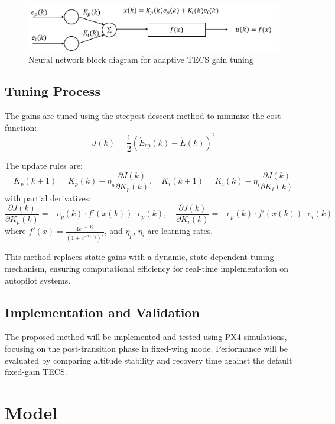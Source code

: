 \documentclass[journal,article,submit,pdftex,moreauthors]{Definitions/mdpi}
\begin{document}
\begin{figure}[H]
    \centering
    \includegraphics[width=0.6\linewidth]{neural_network_diagram.png}
    \caption{Neural network block diagram for adaptive TECS gain tuning}
    \label{fig:neural_network_block_diagram}
\end{figure}

\subsection{Tuning Process}
The gains are tuned using the steepest descent method to minimize the cost function:
\begin{equation}
    J(k) = \frac{1}{2}(\dot{E}_{\text{sp}}(k) - \dot{E}(k))^2
\end{equation}

The update rules are:
\begin{equation}
    K_p(k+1) = K_p(k) - \eta_p \frac{\partial J(k)}{\partial K_p(k)}, \quad K_i(k+1) = K_i(k) - \eta_i \frac{\partial J(k)}{\partial K_i(k)}
\end{equation}
with partial derivatives:
\begin{equation}
    \frac{\partial J(k)}{\partial K_p(k)} = -e_p(k) \cdot f'(x(k)) \cdot e_p(k), \quad \frac{\partial J(k)}{\partial K_i(k)} = -e_p(k) \cdot f'(x(k)) \cdot e_i(k)
\end{equation}
where \(f'(x) = \frac{4e^{-x \cdot Y_g}}{(1 + e^{-x \cdot Y_g})^2}\), and \(\eta_p\), \(\eta_i\) are learning rates.

This method replaces static gains with a dynamic, state-dependent tuning mechanism, ensuring computational efficiency for real-time implementation on autopilot systems.


\subsection{Implementation and Validation}
The proposed method will be implemented and tested using PX4 simulations, focusing on the post-transition phase in fixed-wing mode. Performance will be evaluated by comparing altitude stability and recovery time against the default fixed-gain TECS.


\section{Model}
\end{document}
